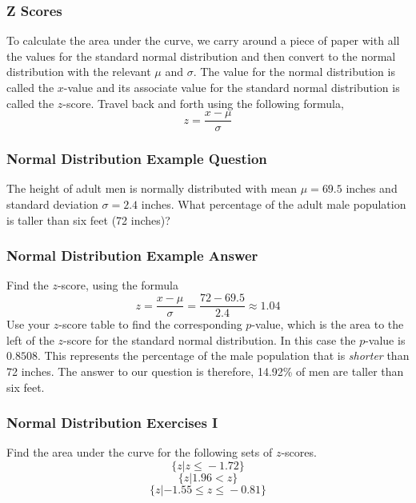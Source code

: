 \documentclass[xcolor=dvipsnames]{beamer}
\begin{document}
\begin{frame}
  \frametitle{Z Scores}
  To calculate the area under the curve, we carry around a piece of
  paper with all the values for the \alert{standard normal
    distribution} and then convert to the normal distribution with the
  relevant $\mu$ and $\sigma$. The value for the normal distribution
  is called the \alert{$x$-value} and its associate value for the
  standard normal distribution is called the \alert{$z$-score}. Travel
  back and forth using the following formula,
  \begin{equation}
    \label{eq:uotoogoo}
    z=\frac{x-\mu}{\sigma}
  \end{equation}
\end{frame}

\begin{frame}
  \frametitle{Normal Distribution Example Question}
   The height of adult men is normally
  distributed with mean $\mu=69.5$ inches and standard deviation
  $\sigma=2.4$ inches. What percentage of the adult male population is
  taller than six feet (72 inches)? 
\end{frame}

\begin{frame}
  \frametitle{Normal Distribution Example Answer}
  Find the $z$-score, using the formula
  \begin{equation}
    \label{eq:eejecheo}
    z=\frac{x-\mu}{\sigma}=\frac{72-69.5}{2.4}\approx{}1.04
  \end{equation}
  Use your $z$-score table to find the corresponding
  \alert{$p$-value}, which is the area to the left of the $z$-score
  for the standard normal distribution. In this case the $p$-value is
  $0.8508$. This represents the percentage of the male population that
  is \emph{shorter} than 72 inches. The answer to our question is
  therefore, 14.92\% of men are taller than six feet.
\end{frame}

\begin{frame}
  \frametitle{Normal Distribution Exercises I}
{\ubung} Find the area under the curve for the following sets of
$z$-scores. 
\begin{equation}
  \label{eq:deapheph}
\{z|z\leq{}-1.72\}  
\end{equation}
\begin{equation}
  \label{eq:taedaiga}
\{z|1.96<{}z\}  
\end{equation}
\begin{equation}
  \label{eq:ahraefis}
\{z|-1.55\leq{}z\leq{}-0.81\}
\end{equation}
\end{frame}
\end{document}
